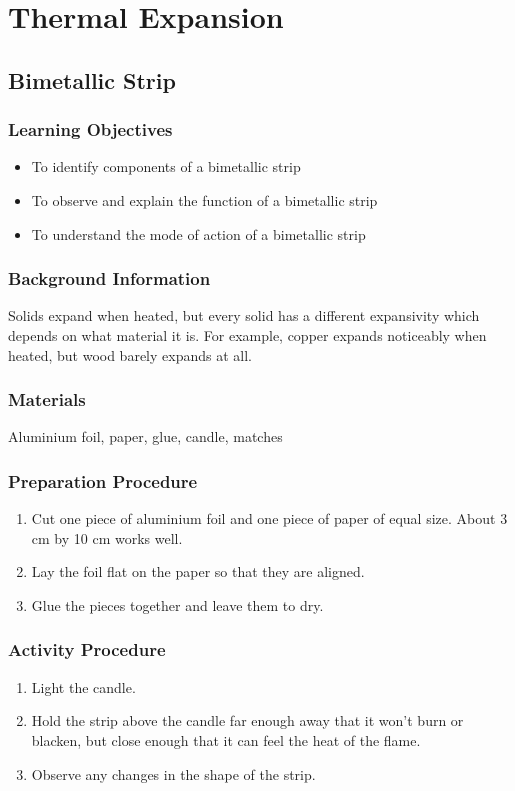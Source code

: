\section{Thermal Expansion}

\subsection{Bimetallic Strip}

\subsubsection*{Learning Objectives}
\begin{itemize}
\item{To identify components of a bimetallic strip} 
\item{To observe and explain the function of a bimetallic strip} 
\item{To understand the mode of action of a bimetallic strip} 
\end{itemize}

\subsubsection*{Background Information}
Solids expand when heated, but every solid has a different expansivity which depends on what material it is. For example, copper expands noticeably when heated, but wood barely expands at all.  

\subsubsection*{Materials}
Aluminium foil, paper, glue, candle, matches

\subsubsection*{Preparation Procedure}
\begin{enumerate}
\item{Cut one piece of aluminium foil and one piece of paper of equal size. About 3 cm by 10 cm works well.} 
\item{Lay the foil flat on the paper so that they are aligned.} 
\item{Glue the pieces together and leave them to dry.} 
\end{enumerate}

\subsubsection*{Activity Procedure}
\begin{enumerate}
\item{Light the candle.} 
\item{Hold the strip above the candle far enough away that it won't burn or blacken, but close enough that it can feel the heat of the flame.} 
\item{Observe any changes in the shape of the strip.} 
\end{enumerate}


